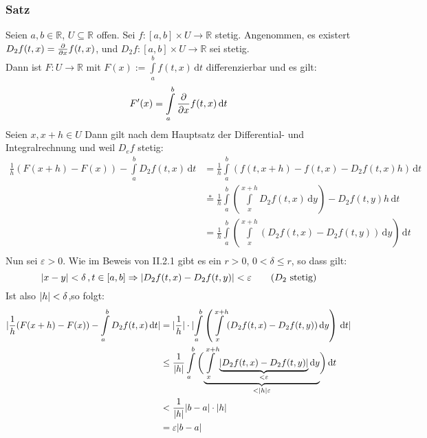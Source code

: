 \subsubsection{Satz} %
\label{ssub:satz}
Seien $a,b \in \mathbb{R}$, $U \subseteq \mathbb{R}$ offen. Sei $f: [a,b]\times U \to \mathbb{R}$ stetig. Angenommen, es existert $D_2f(t,x)= \frac{{\partial }}{{\partial x}} f(t,x)$, und $D_2f:[a,b] \times U \to \mathbb{R}$ sei stetig. \\
Dann ist $F:U \to \mathbb{R}$ mit $F(x):= \int\limits_{a}^{b}f(t,x)\,\mathrm{d}t$ differenzierbar und es gilt:
\[
	F'(x)= \int\limits_{a}^{b}\frac{{\partial }}{{\partial x}} f(t,x) \,\mathrm{d}t
\]
 Seien $x,x+h \in U$
Dann gilt nach dem Hauptsatz der Differential- und Integralrechnung und weil $D_ef$ stetig:
\begin{align*}
	\frac{1}{h}(F(x+h)-F(x))- \int\limits_{a}^{b}D_2f(t,x) \,\mathrm{d}t &= \frac{1}{h}\int\limits_{a}^{b}( f(t,x+h)-f(t,x)-D_2f(t,x)h) \,\mathrm{d}t \\
	&\stackrel{*}{=} \frac{1}{h}\int\limits_{a}^{b}( \int\limits_{x}^{x+h}D_2f(t,x) \,\mathrm{d}y) - D_2f(t,y)h \,\mathrm{d}t \\
	&= \frac{1}{h}\int\limits_{a}^{b}(\int\limits_{x}^{x+h}(D_2f(t,x)-D_2f(t,y)) \,\mathrm{d}y) \,\mathrm{d}t \\
\end{align*} 
Nun sei $\varepsilon>0$. Wie im Beweis von II.2.1 gibt es ein $r>0$, $0 < \delta \leq r$, so dass gilt:
\[
	\lvert x-y\rvert< \delta \,, t \in [a,b] \Rightarrow  \lvert D_2f(t,x)-D_2f(t,y)\rvert < \varepsilon \qquad (D_2 \text{ stetig})
\]
Ist also $\lvert h\rvert< \delta $,so folgt:
\begin{align*}
	\lvert\frac{1}{h}(F(x+h)-F(x))- \int\limits_{a}^{b}D_2f(t,x) \,\mathrm{d}t\rvert &= \lvert\frac{1}{h}\rvert \cdot
	\lvert\int\limits_{a}^{b}\left(\int\limits_{x}^{x+h}(D_2f(t,x)-D_2f(t,y)) \,\mathrm{d}y\right) \,\mathrm{d}t\rvert \\
	& \leq \frac{1}{\lvert h\rvert} \int\limits_{a}^{b}
	\bigg(\underset{<\lvert h\rvert\varepsilon}{\underbrace{\int\limits_{x}^{x+h}\underset{<\varepsilon}{\underbrace{\lvert D_2f(t,x)-D_2f(t,y)\rvert}}\,\mathrm{d}y}}\bigg)  \,\mathrm{d}t \\
	&< \frac{1}{\lvert h\rvert}\lvert b-a\rvert\cdot\lvert h\rvert \\
	&= \varepsilon \lvert b-a\rvert 
	\end{align*}
	\bewende

